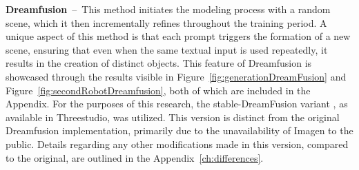\textbf{Dreamfusion}~--~This method initiates the modeling process with a random scene, which it then incrementally refines throughout the training period. A unique aspect of this method is that each prompt triggers the formation of a new scene, ensuring that even when the same textual input is used repeatedly, it results in the creation of distinct objects. This feature of Dreamfusion is showcased through the results visible in Figure~\ref{fig:generationDreamFusion} and Figure~\ref{fig:secondRobotDreamfusion}, both of which are included in the Appendix.
For the purposes of this research, the stable-DreamFusion variant \citep{stable-dreamfusion}, as available in Threestudio, was utilized. This version is distinct from the original Dreamfusion implementation, primarily due to the unavailability of Imagen to the public. Details regarding any other modifications made in this version, compared to the original, are outlined in the Appendix~\ref{ch:differences}. 

